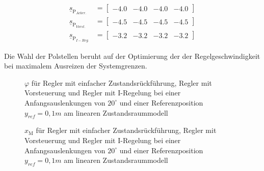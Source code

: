\documentclass[
	pagesize,
	fontsize=12pt,
	paper=a4,
	oneside,
   reqno
]{scrartcl}
\begin{document}
\begin{align*}
    \underline{s}_{\mathrm{P}_{Acker.}} &= 
    \begin{bmatrix}
        -4.0 & -4.0 & -4.0 & -4.0 
    \end{bmatrix} \\
    \underline{s}_{\mathrm{P}_{Vorst.}} &= 
    \begin{bmatrix}
        -4.5 & -4.5 & -4.5 & -4.5 
    \end{bmatrix} \\
    \underline{s}_{\mathrm{P}_{I-Reg.}} &= 
    \begin{bmatrix}
        -3.2 & -3.2 & -3.2 & -3.2 
    \end{bmatrix}
\end{align*}

Die Wahl der Polstellen beruht auf der Optimierung der der Regelgeschwindigkeit bei maximalem Ausreizen der Systemgrenzen.

\begin{figure}[H]
    \centering
    \caption[Reglervergleich für $\varphi$ (linear)]{$\varphi$ für Regler mit einfacher Zustandsrückführung, Regler mit Vorsteuerung und Regler mit I-Regelung bei einer Anfangsauslenkungen von $20^\circ$ und einer Referenzposition $y_{ref} = 0,1 m$ am linearen Zustandsraummodell}
    \label{fig:Bild20.1}
\end{figure}

\begin{figure}[H]
    \centering
    \caption[Reglervergleich für $x_{\mathrm{M}}$ (linear)]{$x_{\mathrm{M}}$ für Regler mit einfacher Zustandsrückführung, Regler mit Vorsteuerung und Regler mit I-Regelung bei einer Anfangsauslenkungen von $20^\circ$ und einer Referenzposition $y_{ref} = 0,1 m$ am linearen Zustandsraummodell}
    \label{fig:Bild20.2}
\end{figure}
\end{document}
